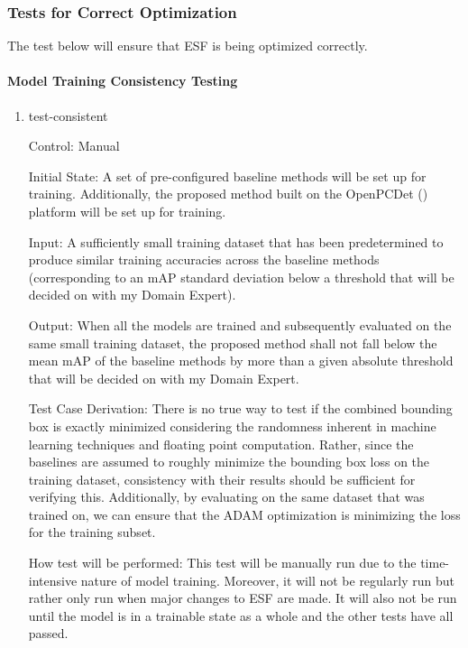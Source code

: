 \documentclass[12pt, titlepage]{article}
\newcommand{\ProjectName}{ESF }
\begin{document}
\subsubsection{Tests for Correct Optimization}

The test below will ensure that \ProjectName{}is being optimized correctly.

\paragraph{Model Training Consistency Testing}
\begin{enumerate}

  \item{test-consistent\\}
  
  Control: Manual
            
  Initial State: A set of pre-configured baseline methods will be set up for training. Additionally, the proposed method built on the OpenPCDet (\cite{openpcdet2020}) platform
  will be set up for training.
            
  Input: A sufficiently small training dataset that has been predetermined to produce similar training accuracies across the baseline methods 
  (corresponding to an mAP standard deviation below a threshold that will be decided on with my Domain Expert).
            
  Output: When all the models are trained and subsequently evaluated on the same small training dataset, the proposed method shall not fall below the mean mAP of
  the baseline methods by more than a given absolute threshold that will be decided on with my Domain Expert.
  
  Test Case Derivation: There is no true way to test if the combined bounding box is exactly minimized considering the randomness inherent in machine learning techniques
  and floating point computation. Rather, since the baselines are assumed to roughly minimize the bounding box loss on the training dataset, consistency with their results 
  should be sufficient for verifying this. Additionally, by evaluating on the same dataset that was trained on, we can ensure that the ADAM optimization is minimizing the loss
  for the training subset.
            
  How test will be performed: This test will be manually run due to the time-intensive nature of model training. Moreover, it will not be regularly run but rather only run when 
  major changes to \ProjectName{} are made. It will also not be run until the model is in a trainable state as a whole and the other tests have all passed.
\end{enumerate}
\end{document}
